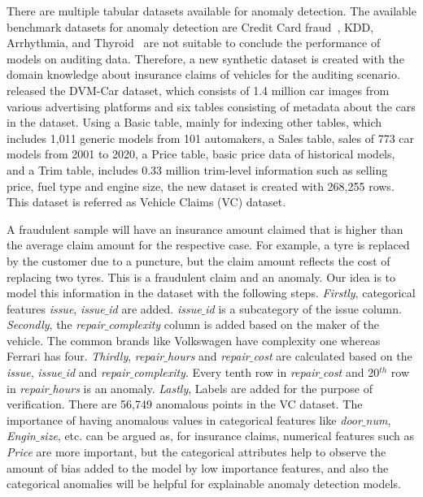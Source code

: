 \documentclass{article}
\begin{document}
There are multiple tabular datasets available for anomaly detection. The available benchmark datasets for anomaly detection are Credit Card fraud~\citep{creditcard}, KDD, Arrhythmia, and Thyroid~\citep{ucidata} are not suitable to conclude the performance of models on auditing data. Therefore, a new synthetic dataset is created with the domain knowledge about insurance claims of vehicles for the auditing scenario. \citep{DVI} released the DVM-Car dataset, which consists of 1.4 million car images from various advertising platforms and six tables consisting of metadata about the cars in the dataset. Using a Basic table, mainly for indexing other tables, which includes 1,011 generic models from 101 automakers, a Sales table, sales of 773 car models from 2001 to 2020, a Price table, basic price data of historical models, and a Trim table, includes 0.33 million trim-level information such as selling price, fuel type and engine size, the new dataset is created with 268,255 rows. This dataset is referred as Vehicle Claims (VC) dataset.

A fraudulent sample will have an insurance amount claimed that is higher than the average claim amount for the respective case. For example, a tyre is replaced by the customer due to a puncture, but the claim amount reflects the cost of replacing two tyres. This is a fraudulent claim and an anomaly. Our idea is to model this information in the dataset with the following steps. \textit{Firstly}, categorical features \textit{issue}, \textit{issue$\_$id} are added. \textit{issue$\_$id} is a subcategory of the issue column. \textit{Secondly}, the \textit{repair$\_$complexity}  column is added based on the maker of the vehicle. The common brands like Volkswagen have complexity one whereas Ferrari has four. \textit{Thirdly}, \textit{repair$\_$hours} and \textit{repair$\_$cost} are calculated based on the \textit{issue}, \textit{issue$\_$id} and \textit{repair$\_$complexity}. Every tenth row in \textit{repair$\_$cost} and 20$^{th}$ row in \textit{repair$\_$hours} is an anomaly. \textit{Lastly}, Labels are added for the purpose of verification. There are 56,749 anomalous points in the VC dataset. The importance of having anomalous values in categorical features like  \textit{door$\_$num}, \textit{Engin$\_$size}, etc. can be argued as, for insurance claims, numerical features such as \textit{Price} are more important, but the categorical attributes help to observe the amount of bias added to the model by low importance features, and also the categorical anomalies will be helpful for explainable anomaly detection models.
\end{document}

